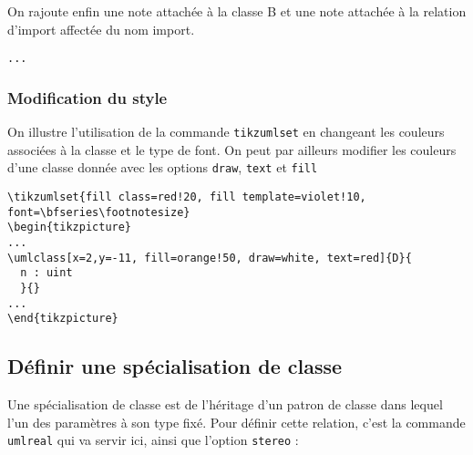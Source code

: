 \documentclass[a4paper,11pt]{report}
\newcommand{\inputTikZ}[1]{%
  }%
\newcommand{\inputTikZ}[1]{%
    \texttt{[image: fig/\#1.pdf]}%
  }%
\begin{document}
On rajoute enfin une note attachée à la classe B et une note attachée à la relation d'import affectée du nom import.

\medskip

\hspace{-0.7cm}\lstinline{...}
{\color{red!70!black}

}

\begin{center}
\inputTikZ{classdiagstep4}
\end{center}

\subsubsection{Modification du style}

On illustre l'utilisation de la commande {\tt tikzumlset} en changeant les couleurs associées à la classe et le type de font. On peut par ailleurs modifier les couleurs d'une classe donnée avec les options {\tt draw}, {\tt text} et {\tt fill}

\medskip

\begin{lstlisting}
\tikzumlset{fill class=red!20, fill template=violet!10, font=\bfseries\footnotesize}
\begin{tikzpicture}
...
\umlclass[x=2,y=-11, fill=orange!50, draw=white, text=red]{D}{
  n : uint
  }{}
...
\end{tikzpicture}
\end{lstlisting}

\begin{center}
\inputTikZ{tikzumlset}
\end{center}

\subsection{Définir une spécialisation de classe}

Une spécialisation de classe est de l'héritage d'un patron de classe dans lequel l'un des paramètres à son type fixé. Pour définir cette relation, c'est la commande {\tt umlreal} qui va servir ici, ainsi que l'option {\tt stereo} :

\medskip

\begin{minipage}{0.5\textwidth}

\end{minipage}
\begin{minipage}{0.5\textwidth}
\begin{center}
\inputTikZ{specialisation}
\end{center}
\end{minipage}
\end{document}
